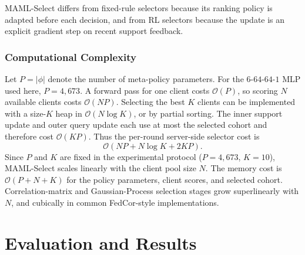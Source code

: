 \documentclass[journal]{IEEEtran}
\newcommand{\revision}[1]{#1}
\begin{document}
\revision{MAML-Select differs from fixed-rule selectors because its ranking policy is adapted before each decision, and from RL selectors because the update is an explicit gradient step on recent support feedback.}

\subsubsection{Computational Complexity}
\revision{Let $P=|\phi|$ denote the number of meta-policy parameters. For the $6$-$64$-$64$-$1$ MLP used here, $P=4{,}673$. A forward pass for one client costs $\mathcal{O}(P)$, so scoring $N$ available clients costs $\mathcal{O}(NP)$. Selecting the best $K$ clients can be implemented with a size-$K$ heap in $\mathcal{O}(N\log K)$, or by partial sorting. The inner support update and outer query update each use at most the selected cohort and therefore cost $\mathcal{O}(KP)$. Thus the per-round server-side selector cost is}
\begin{equation}
	\mathcal{O}\!\left(NP + N\log K + 2KP\right).
	\label{eq:selector_complexity}
\end{equation}
\revision{Since $P$ and $K$ are fixed in the experimental protocol ($P=4{,}673$, $K=10$), MAML-Select scales linearly with the client pool size $N$. The memory cost is $\mathcal{O}(P+N+K)$ for the policy parameters, client scores, and selected cohort. Correlation-matrix and Gaussian-Process selection stages grow superlinearly with $N$, and cubically in common FedCor-style implementations.}

\section{Evaluation and Results}
\end{document}
